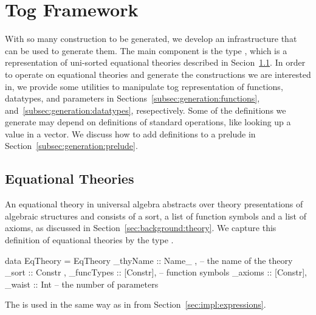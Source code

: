 \section{Tog Framework}
\label{sec:togFamework}
With so many construction to be generated, we develop an infrastructure that can be used to generate them. The main component is the type , which is a representation of uni-sorted equational theories described in Secion~\ref{subsec:generation:eqTheories}. 
In order to operate on equational theories and generate the constructions we are interested in, we provide some utilities to manipulate tog representation of functions, datatypes, and parameters in Sections~\ref{subsec:generation:functions}, and~\ref{subsec:generation:datatypes}, resepectively. 
Some of the definitions we generate may depend on definitions of standard operations, like looking up a value in a vector. We discuss how to add definitions to a prelude in Section~\ref{subsec:generation:prelude}. 



\subsection{Equational Theories}
\label{subsec:generation:eqTheories}
An equational theory in universal algebra abstracts over theory presentations of algebraic structures and consists of a sort, a list of function symbols and a list of axioms, as discussed in Section~\ref{sec:background:theory}. We capture this definition of equational theories by the type . 
\begin{hscode}
data EqTheory = EqTheory {
  _thyName    :: Name_  ,   -- the name of the theory 
  _sort       :: Constr ,      
  _funcTypes  :: [Constr], -- function symbols 
  _axioms     :: [Constr],
  _waist      :: Int }     -- the number of parameters 
\end{hscode}
The  is used in the same way as in  from Section~\ref{sec:impl:expressions}. 

